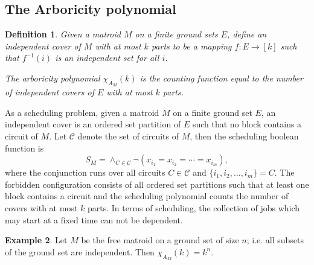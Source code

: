 \documentclass[12pt,reqno]{amsart}
\newtheorem{definition}{Definition}
\numberwithin{definition}{section}
\theoremstyle{definition}
\newtheorem{example}[definition]{Example}
\begin{document}
\subsection{The Arboricity polynomial}

\begin{definition} Given a matroid $M$ on a finite ground sets $E$, define an independent cover of $M$ with at most $k$ parts to be a mapping $f : E \rightarrow [k]$ such that $f^{-1}(i)$ is an independent set for all $i$.  

  The arboricity polynomial $\chi_{A_M}(k)$ is the counting function equal to the number of independent covers of $E$ with at most $k$ parts.
\end{definition}


As a scheduling problem, given a matroid $M$ on a finite ground set
$E$, an independent cover is an ordered set partition of $E$ such
that no block contains a circuit of $M$. Let $\mathcal{C}$ denote the set of circuits of $M$, then the scheduling boolean function is
$$S_M = \wedge_{C \in \mathcal{C}} \neg(x_{i_1} = x_{i_2} = \cdots = x_{i_m}),$$
where the conjunction runs over all circuits $C \in \mathcal{C}$ and $\{i_1, i_2, \ldots, i_m\} = C$.
The forbidden configuration consists of all ordered set partitions such that at least one block contains a circuit and the scheduling polynomial counts the number of covers with at most $k$ parts.   In terms of scheduling, the collection of jobs which may start at a fixed time can not be dependent.  

\begin{example}

Let $M$ be the free matroid on a ground set of size $n$; i.e. all subsets of the ground set are independent.  Then $\chi_{A_M}(k) = k^n$.  

\end{example}
\end{document}
